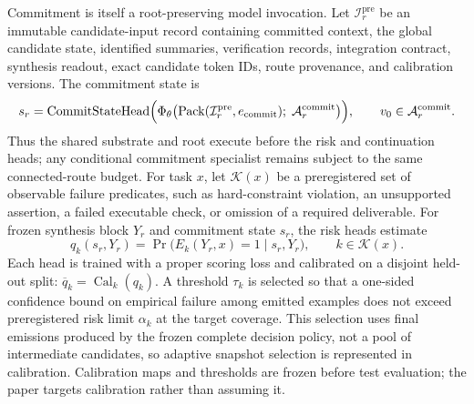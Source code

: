 \documentclass[10pt,a4paper]{article}
\newcommand{\op}[1]{\operatorname{#1}}
\newcommand{\Acal}{\mathcal{A}}
\newcommand{\Kcal}{\mathcal{K}}
\newcommand{\Ical}{\mathcal{I}}
\begin{document}
Commitment is itself a root-preserving model invocation. Let
$\Ical^{\mathrm{pre}}_r$ be an immutable candidate-input record containing
committed context, the global candidate state, identified summaries,
verification records, integration contract, synthesis readout, exact candidate
token IDs, route provenance, and calibration versions. The commitment state is
\begin{equation}
s_r = \op{CommitStateHead}\Bigl( \Phi_\theta\bigl(
  \op{Pack}( \Ical^{\mathrm{pre}}_r, e_{\mathrm{commit}} );\;
  \Acal^{\mathrm{commit}}_r \bigr) \Bigr),
\qquad v_0 \in \Acal^{\mathrm{commit}}_r .
\end{equation}
Thus the shared substrate and root execute before the risk and continuation
heads; any conditional commitment specialist remains subject to the same
connected-route budget. For task $x$, let $\Kcal(x)$ be a preregistered set of
observable failure predicates, such as hard-constraint violation, an
unsupported assertion, a failed executable check, or omission of a required
deliverable. For frozen synthesis block $Y_r$ and commitment state $s_r$, the
risk heads estimate
\begin{equation}
q_k(s_r, Y_r) = \Pr\bigl( E_k(Y_r, x) = 1 \mid s_r, Y_r \bigr),
\qquad k \in \Kcal(x).
\end{equation}
Each head is trained with a proper scoring loss and calibrated on a disjoint
held-out split: $\overline{q}_k = \op{Cal}_k(q_k)$. A threshold $\tau_k$ is
selected so that a one-sided confidence bound on empirical failure among
emitted examples does not exceed preregistered risk limit $\alpha_k$ at the
target coverage. This selection uses final emissions produced by the frozen
complete decision policy, not a pool of intermediate candidates, so adaptive
snapshot selection is represented in calibration. Calibration maps and
thresholds are frozen before test evaluation; the paper targets calibration
rather than assuming it.
\end{document}
